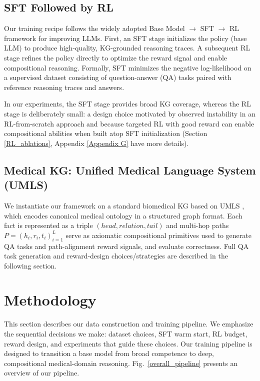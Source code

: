 \documentclass{article}
\theoremstyle{plain}
\theoremstyle{definition}
\theoremstyle{remark}
\begin{document}
\enlargethispage{2\baselineskip}
\subsection{SFT Followed by RL} %
Our training recipe follows the widely adopted Base Model $\rightarrow$ SFT $\rightarrow$ RL framework for improving LLMs. First, an SFT stage initializes the policy (base LLM) to produce high-quality, KG-grounded reasoning traces. A subsequent RL stage refines the policy directly to optimize the reward signal and enable compositional reasoning. Formally, SFT minimizes the negative log-likelihood on a supervised dataset consisting of question-answer (QA) tasks paired with reference reasoning traces and answers.

In our experiments, the SFT stage provides broad KG coverage, whereas the RL stage is deliberately small: a design choice motivated by observed instability in an RL-from-scratch approach and because targeted RL with good reward can enable compositional abilities when built atop SFT initialization (Section \ref{RL_ablations}, Appendix \ref{Appendix G} have more details).

\subsection{Medical KG: Unified Medical Language System (UMLS)}
We instantiate our framework on a standard biomedical KG based on UMLS \cite{bodenreider2004unified}, which encodes canonical medical ontology in a structured graph format. Each fact is represented as a triple $(head, relation, tail)$ and multi-hop paths $P = {(h_i, r_i, t_i)}_{i=1}^L$ serve as axiomatic compositional primitives used to generate QA tasks and path-alignment reward signals, and evaluate correctness. Full QA task generation and reward-design choices/strategies are described in the following section.

\enlargethispage{2\baselineskip}
\section{Methodology}
\label{Methodology}
This section describes our data construction and training pipeline. We emphasize the sequential decisions we make: dataset choices, SFT warm start, RL budget, reward design, and experiments that guide these choices. Our training pipeline is designed to transition a base model from broad competence to deep, compositional medical-domain reasoning. Fig.~\ref{overall_pipeline} presents an overview of our pipeline. %
\end{document}
